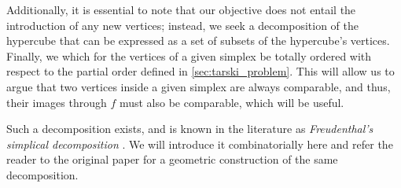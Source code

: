 Additionally, it is essential to note that our objective does not entail the introduction of any new vertices; instead, we seek a decomposition of the hypercube that can be expressed as a set of subsets of the hypercube's vertices. Finally, we which for the vertices of a given simplex be totally ordered with respect to the partial order defined in \cref{sec:tarski_problem}. This will allow us to argue that two vertices inside a given simplex are always comparable, and thus, their images through $f$ must also be comparable, which will be useful.

Such a decomposition exists, and is known in the literature as \textit{Freudenthal's simplical decomposition} . We will introduce it combinatorially here and refer the reader to the original paper for a geometric construction of the same decomposition.

